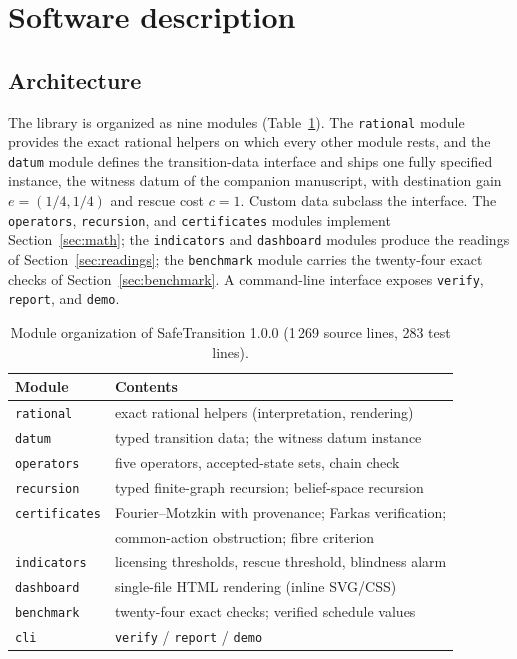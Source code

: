 \documentclass[3p,11pt]{elsarticle}
\begin{document}
\section{Software description}\label{sec:software}

\subsection{Architecture}\label{sec:architecture}

The library is organized as nine modules (Table~\ref{tab:modules}). The
\texttt{rational} module provides the exact rational helpers on which every
other module rests, and the \texttt{datum} module defines the transition-data interface and ships one
fully specified instance, the witness datum of the companion manuscript,
with destination gain $e = (1/4, 1/4)$ and rescue cost $c = 1$. Custom data
subclass the interface. The \texttt{operators}, \texttt{recursion}, and
\texttt{certificates} modules implement Section~\ref{sec:math}; the
\texttt{indicators} and \texttt{dashboard} modules produce the readings of
Section~\ref{sec:readings}; the \texttt{benchmark} module carries the
twenty-four exact checks of Section~\ref{sec:benchmark}. A command-line
interface exposes \texttt{verify}, \texttt{report}, and \texttt{demo}.

\begin{table}[t]
\centering
\small
\begin{tabular}{@{}ll@{}}
\toprule
Module & Contents \\
\midrule
\texttt{rational} & exact rational helpers (interpretation, rendering) \\
\texttt{datum} & typed transition data; the witness datum instance \\
\texttt{operators} & five operators, accepted-state sets, chain check \\
\texttt{recursion} & typed finite-graph recursion; belief-space recursion \\
\texttt{certificates} & Fourier--Motzkin with provenance; Farkas verification; \\
                       & common-action obstruction; fibre criterion \\
\texttt{indicators} & licensing thresholds, rescue threshold, blindness alarm \\
\texttt{dashboard} & single-file HTML rendering (inline SVG/CSS) \\
\texttt{benchmark} & twenty-four exact checks; verified schedule values \\
\texttt{cli} & \texttt{verify} / \texttt{report} / \texttt{demo} \\
\bottomrule
\end{tabular}
\caption{Module organization of SafeTransition 1.0.0
(1\,269 source lines, 283 test lines).}
\label{tab:modules}
\end{table}
\end{document}
